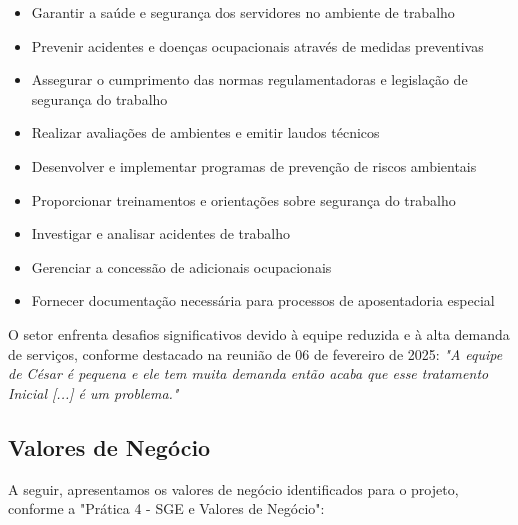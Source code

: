 \documentclass[12pt,a4paper]{article}
\begin{document}
\begin{itemize}
    \item Garantir a saúde e segurança dos servidores no ambiente de trabalho
    \item Prevenir acidentes e doenças ocupacionais através de medidas preventivas
    \item Assegurar o cumprimento das normas regulamentadoras e legislação de segurança do trabalho
    \item Realizar avaliações de ambientes e emitir laudos técnicos
    \item Desenvolver e implementar programas de prevenção de riscos ambientais
    \item Proporcionar treinamentos e orientações sobre segurança do trabalho
    \item Investigar e analisar acidentes de trabalho
    \item Gerenciar a concessão de adicionais ocupacionais
    \item Fornecer documentação necessária para processos de aposentadoria especial
\end{itemize}

O setor enfrenta desafios significativos devido à equipe reduzida e à alta demanda de serviços, conforme destacado na reunião de 06 de fevereiro de 2025: \textit{"A equipe de César é pequena e ele tem muita demanda então acaba que esse tratamento Inicial [...] é um problema."}

\subsection{Valores de Negócio}

A seguir, apresentamos os valores de negócio identificados para o projeto, conforme a "Prática 4 - SGE e Valores de Negócio":
\end{document}
